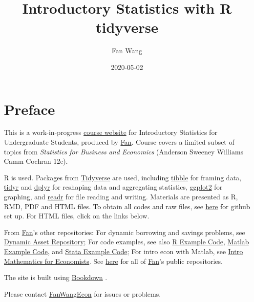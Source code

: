 \documentclass[
]{book}
\title{Introductory Statistics with R tidyverse}
\author{Fan Wang}
\date{2020-05-02}
\begin{document}
\maketitle

{
\hypersetup{linkcolor=}
\setcounter{tocdepth}{1}
\tableofcontents
}
\hypertarget{preface}{%
\chapter*{Preface}\label{preface}}

This is a work-in-progress \href{https://fanwangecon.github.io/Stat4Econ/}{course website} for Introductory Statistics for Undergraduate Students, produced by \href{https://fanwangecon.github.io/}{Fan}. Course covers a limited subset of topics from \emph{Statistics for Business and Economics} (Anderson Sweeney Williams Camm Cochran 12e).

R is used. Packages from \href{https://www.tidyverse.org/}{Tidyverse} \citep{R-tidyverse} are used, including \href{https://tibble.tidyverse.org/}{tibble} \citep{R-tibble} for framing data, \href{https://dplyr.tidyverse.org/}{tidyr} \citep{R-tidyr} and \href{https://dplyr.tidyverse.org/}{dplyr} \citep{R-dplyr} for reshaping data and aggregating statistics, \href{https://ggplot2.tidyverse.org/}{ggplot2} \citep{R-ggplot2} for graphing, and \href{https://readr.tidyverse.org/}{readr} \citep{R-readr} for file reading and writing. Materials are presented as R, RMD, PDF and HTML files. To obtain all codes and raw files, see \href{https://fanwangecon.github.io/Stat4Econ/docs/gitsetup.html}{here} for github set up. For HTML files, click on the links below.

From \href{https://fanwangecon.github.io/}{Fan}'s other repositories: For dynamic borrowing and savings problems, see \href{https://fanwangecon.github.io/CodeDynaAsset/}{Dynamic Asset Repository}; For code examples, see also \href{https://fanwangecon.github.io/R4Econ/}{R Example Code}, \href{https://fanwangecon.github.io/M4Econ/}{Matlab Example Code}, and \href{https://fanwangecon.github.io/Stata4Econ/}{Stata Example Code}; For intro econ with Matlab, see \href{https://fanwangecon.github.io/Math4Econ/}{Intro Mathematics for Economists}. See \href{https://github.com/FanWangEcon}{here} for all of \href{https://fanwangecon.github.io/}{Fan}'s public repositories.

The site is built using \href{https://bookdown.org/}{Bookdown} \citep{R-bookdown}.

Please contact \href{https://fanwangecon.github.io/}{FanWangEcon} for issues or problems.
\end{document}
